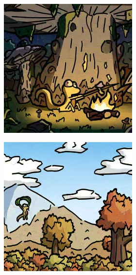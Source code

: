 \documentclass{article}
\begin{document}
\begin{figure}[h]
\begin{subfigure}[t]{\textwidth}
\begin{subfigure}[b]{0.24\textwidth}
     \end{subfigure}
     \hfill
     \begin{subfigure}[b]{0.24\textwidth}
         \centering
         \includegraphics[width=\textwidth]{plots/process/glaze/0005.jpg}
     \end{subfigure}
     \hfill
     \begin{subfigure}[b]{0.24\textwidth}
         \centering
         \includegraphics[width=\textwidth]{plots/process/glaze/0009.jpg}

\end{subfigure}
\end{subfigure}
\end{figure}
\end{document}
